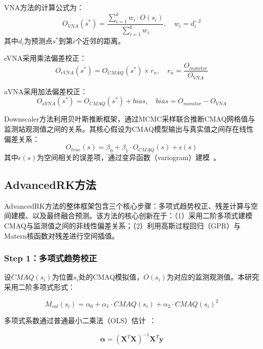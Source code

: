 \documentclass[UTF8, a4paper, 12pt]{article}
\begin{document}
VNA方法的计算公式为：
\begin{equation}
O_{VNA}(s^*) = \frac{\sum_{i=1}^{k} w_i \cdot O(s_i)}{\sum_{i=1}^{k} w_i}, \quad w_i = d_i^{-2}
\end{equation}
其中$d_i$为预测点$s^*$到第$i$个近邻的距离。

eVNA采用乘法偏差校正：
\begin{equation}
O_{eVNA}(s^*) = O_{CMAQ}(s^*) \times r_n, \quad r_n = \frac{O_{monitor}}{O_{VNA}}
\end{equation}

aVNA采用加法偏差校正：
\begin{equation}
O_{aVNA}(s^*) = O_{CMAQ}(s^*) + bias, \quad bias = O_{monitor} - O_{VNA}
\end{equation}

Downscaler方法利用贝叶斯推断框架，通过MCMC采样联合推断CMAQ网格值与监测站观测值之间的关系。其核心假设为CMAQ模型输出与真实值之间存在线性偏差关系：
\begin{equation}
O_{true}(s) = \beta_0 + \beta_1 \cdot O_{CMAQ}(s) + \epsilon(s)
\end{equation}
其中$\epsilon(s)$为空间相关的误差项，通过变异函数（variogram）建模~\cite{rodriguez2025downscaling}。

\subsection{AdvancedRK方法}

AdvancedRK方法的整体框架包含三个核心步骤：多项式趋势校正、残差计算与空间建模、以及最终融合预测。该方法的核心创新在于：（1）采用二阶多项式建模CMAQ与监测值之间的非线性偏差关系；（2）利用高斯过程回归（GPR）与Matern核函数对残差进行空间插值。

\subsubsection{Step 1：多项式趋势校正}

设$CMAQ(s_i)$为位置$s_i$处的CMAQ模拟值，$O(s_i)$为对应的监测观测值。本研究采用二阶多项式形式：

\begin{equation}
M_{cal}(s_i) = \alpha_0 + \alpha_1 \cdot CMAQ(s_i) + \alpha_2 \cdot CMAQ(s_i)^2
\end{equation}

多项式系数通过普通最小二乘法（OLS）估计~\cite{rasmussen2006gaussian}：

\begin{equation}
\boldsymbol{\alpha} = (\mathbf{X}^T \mathbf{X})^{-1} \mathbf{X}^T \mathbf{y}
\end{equation}
\end{document}
